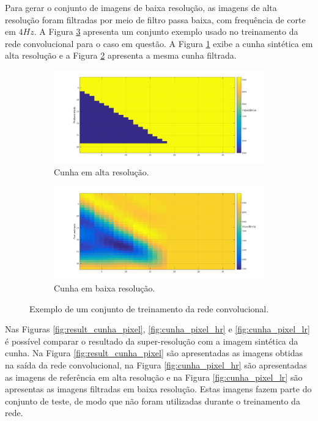Para gerar o conjunto de imagens de baixa resolução, as imagens de alta resolução foram filtradas por meio de filtro
passa baixa, com frequência de corte em $4Hz$. A Figura \ref{fig:cunhas} apresenta um conjunto exemplo
usado no treinamento da rede convolucional para o caso em questão. A Figura \ref{fig:cunhahr} exibe
a cunha sintética em alta resolução e a Figura \ref{fig:cunhalr} apresenta a mesma cunha filtrada.
\begin{figure}[ht]
\centering
\begin{subfigure}{.8\textwidth}
  \includegraphics[width=.9\linewidth]{fig/cunha_hr}
  \caption{Cunha em alta resolução.}
  \label{fig:cunhahr}
\end{subfigure}
\begin{subfigure}{.8\textwidth}
  \includegraphics[width=.9\linewidth]{fig/cunha_lr}
  \caption{Cunha em baixa resolução.}
  \label{fig:cunhalr}
\end{subfigure}%
\caption{Exemplo de um conjunto de treinamento da rede convolucional.}
\label{fig:cunhas}
\end{figure}

Nas Figuras \ref{fig:result_cunha_pixel}, \ref{fig:cunha_pixel_hr} e \ref{fig:cunha_pixel_lr} é possível comparar
o resultado da super-resolução com a imagem sintética da cunha. Na Figura \ref{fig:result_cunha_pixel} são
apresentadas as imagens obtidas na saída da rede convolucional, na Figura \ref{fig:cunha_pixel_hr} são
apresentadas as imagens de referência em alta resolução e na Figura \ref{fig:cunha_pixel_lr} são apresentas
as imagens filtradas em baixa resolução. Estas imagens fazem parte do conjunto de teste,
de modo que não foram utilizadas durante o treinamento da rede. 

